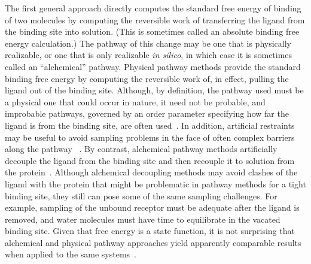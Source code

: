 \documentclass[aps,pre,twocolumn,nofootinbib,superscriptaddress,10pt, final,tightenlines]{revtex4-1}
\begin{document}
The first general approach directly computes the standard free energy of binding of two molecules by computing the reversible work of transferring the ligand from the binding site into solution. 
(This is sometimes called an absolute binding free energy calculation.) 
The pathway of this change may be one that is physically realizable, or one that is only realizable {\em in silico}, in which case it is sometimes called an ``alchemical'' pathway. 
Physical pathway methods provide the standard binding free energy by computing the reversible work of, in effect, pulling the ligand out of the binding site. 
Although, by definition, the pathway used must be a physical one that could occur in nature, it need not be probable, and improbable pathways, governed by an order parameter specifying how far the ligand is from the binding site, are often used~\cite{woo_calculation_2005, ytreberg_absolute_2009, velez-vega_overcoming_2013, henriksen_computational_2015, hsiao_prediction_2014, bhakat_resolving_2016}.  
In addition, artificial restraints may be useful to avoid sampling problems in the face of often complex barriers along the pathway ~\cite{woo_calculation_2005, velez-vega_overcoming_2013, henriksen_computational_2015, hsiao_prediction_2014, bhakat_resolving_2016}. 
By contrast, alchemical pathway methods artificially decouple the ligand from the binding site and then recouple it to solution from the protein~\cite{jorgensen_efficient_1988, Hermans:1986:Isr.J.Chem., gilson_statistical-thermodynamic_1997, boresch_absolute_2003, mobley_use_2006}.
Although alchemical decoupling methods may avoid clashes of the ligand with the protein that might be problematic in pathway methods for a tight binding site, they still can pose some of the same sampling challenges.
For example, sampling of the unbound receptor must be adequate after the ligand is removed, and water molecules must have time to equilibrate in the vacated binding site.
Given that free energy is a state function, it is not surprising that alchemical and physical pathway approaches yield apparently comparable results when applied to the same systems~\cite{lee_calculation_2006, gumbart_standard_2013, de_ruiter_proteinligand_2013, yin_overview_2016}.  
\end{document}
